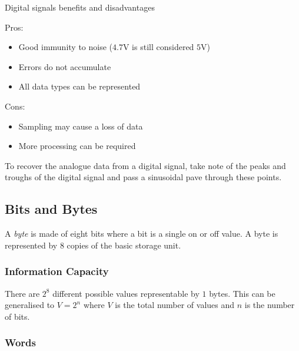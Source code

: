 \medskip
\begin{highlight}{Digital signals benefits and disadvantages}
    \begin{minipage}[t]{0.45\linewidth}
        Pros:
        \begin{itemize}
            \item Good immunity to noise (\(4.7\)V is still considered \(5\)V)
            \item Errors do not accumulate
            \item All data types can be represented
        \end{itemize}
    \end{minipage}
    \hfill
    \begin{minipage}[t]{0.45\linewidth}
        Cons:
        \begin{itemize}
            \item Sampling may cause a loss of data
            \item More processing can be required
        \end{itemize}
    \end{minipage}
\end{highlight}

\begin{note}
    To recover the analogue data from a digital signal, take note of the peaks and troughs of the digital signal and pass a sinusoidal pave through these points.
\end{note}

\subsection{Bits and Bytes}\label{sub:bits_and_bytes}

A \emph{byte} is made of eight bits where a bit is a single on or off value.
A byte is represented by \(8\) copies of the basic storage unit.

\subsubsection{Information Capacity}\label{ssub:information_capacity}

There are \(2^8\) different possible values representable by \(1\) bytes.
This can be generalised to \(V=2^{n}\) where \(V\) is the total number of values and \(n\) is the number of bits.

\subsubsection{Words}\label{ssub:words}

